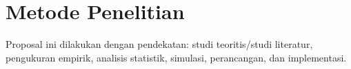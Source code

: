 \section{Metode Penelitian}
Proposal ini dilakukan dengan pendekatan: studi teoritis/studi literatur, pengukuran empirik, analisis statistik, simulasi, perancangan, dan implementasi.


